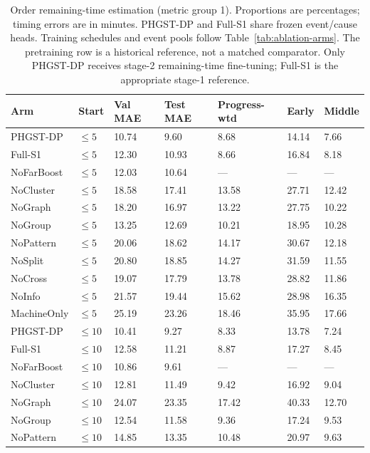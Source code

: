 \begin{table}[p]
\centering
\scriptsize
\setlength{\tabcolsep}{3pt}
\renewcommand{\arraystretch}{1.12}
\caption{Order remaining-time estimation (metric group 1). Proportions are percentages; timing errors are in minutes. PHGST-DP and Full-S1 share frozen event/cause heads. Training schedules and event pools follow Table~\ref{tab:ablation-arms}. The pretraining row is a historical reference, not a matched comparator. Only PHGST-DP receives stage-2 remaining-time fine-tuning; Full-S1 is the appropriate stage-1 reference.}
\label{tab:complete-5-1}
\begin{tabularx}{\textwidth}{@{}lXXXXXX@{}}
\toprule
Arm & Start & Val MAE & \textbf{Test MAE} & Progress-wtd & Early & Middle \\
\midrule
PHGST-DP & $\le 5$ & 10.74 & 9.60 & 8.68 & 14.14 & 7.66 \\
Full-S1 & $\le 5$ & 12.30 & 10.93 & 8.66 & 16.84 & 8.18 \\
NoFarBoost & $\le 5$ & 12.03 & 10.64 & --- & --- & --- \\
NoCluster & $\le 5$ & 18.58 & 17.41 & 13.58 & 27.71 & 12.42 \\
NoGraph & $\le 5$ & 18.20 & 16.97 & 13.22 & 27.75 & 10.22 \\
NoGroup & $\le 5$ & 13.25 & 12.69 & 10.21 & 18.95 & 10.28 \\
NoPattern & $\le 5$ & 20.06 & 18.62 & 14.17 & 30.67 & 12.18 \\
NoSplit & $\le 5$ & 20.80 & 18.85 & 14.27 & 31.59 & 11.55 \\
NoCross & $\le 5$ & 19.07 & 17.79 & 13.78 & 28.82 & 11.86 \\
NoInfo & $\le 5$ & 21.57 & 19.44 & 15.62 & 28.98 & 16.35 \\
MachineOnly & $\le 5$ & 25.19 & 23.26 & 18.46 & 35.95 & 17.66 \\
\midrule
PHGST-DP & $\le 10$ & 10.41 & 9.27 & 8.33 & 13.78 & 7.24 \\
Full-S1 & $\le 10$ & 12.58 & 11.21 & 8.87 & 17.27 & 8.45 \\
NoFarBoost & $\le 10$ & 10.86 & 9.61 & --- & --- & --- \\
NoCluster & $\le 10$ & 12.81 & 11.49 & 9.42 & 16.92 & 9.04 \\
NoGraph & $\le 10$ & 24.07 & 23.35 & 17.42 & 40.33 & 12.70 \\
NoGroup & $\le 10$ & 12.54 & 11.58 & 9.36 & 17.24 & 9.53 \\
NoPattern & $\le 10$ & 14.85 & 13.35 & 10.48 & 20.97 & 9.63 \\

\end{tabularx}
\end{table}
